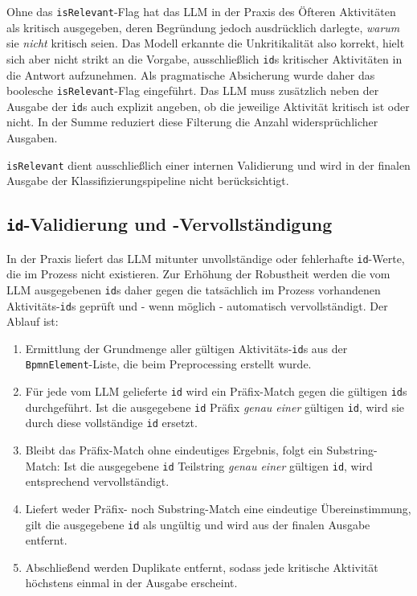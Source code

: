Ohne das \texttt{isRelevant}-Flag hat das \ac{LLM} in der Praxis des Öfteren Aktivitäten als kritisch ausgegeben, deren Begründung jedoch ausdrücklich darlegte, \emph{warum} sie \emph{nicht} kritisch seien. Das Modell erkannte die Unkritikalität also korrekt, hielt sich aber nicht strikt an die Vorgabe, ausschließlich \texttt{id}s kritischer Aktivitäten in die Antwort aufzunehmen. Als pragmatische Absicherung wurde daher das boolesche \texttt{isRelevant}-Flag eingeführt. Das \ac{LLM} muss zusätzlich neben der Ausgabe der \texttt{id}s auch explizit angeben, ob die jeweilige Aktivität kritisch ist oder nicht. In der Summe reduziert diese Filterung die Anzahl widersprüchlicher Ausgaben.

\texttt{isRelevant} dient ausschließlich einer internen Validierung und wird in der finalen Ausgabe der Klassifizierungspipeline nicht berücksichtigt.

\subsection*{\texttt{id}-Validierung und -Vervollständigung}

In der Praxis liefert das \ac{LLM} mitunter unvollständige oder fehlerhafte \texttt{id}-Werte, die im Prozess nicht existieren. Zur Erhöhung der Robustheit werden die vom \ac{LLM} ausgegebenen \texttt{id}s daher gegen die tatsächlich im Prozess vorhandenen Aktivitäts-\texttt{id}s geprüft und - wenn möglich - automatisch vervollständigt. Der Ablauf ist:

\begin{enumerate}
    \item Ermittlung der Grundmenge aller gültigen Aktivitäts-\texttt{id}s aus der \texttt{BpmnElement}-Liste, die beim Preprocessing erstellt wurde.
    \item Für jede vom \ac{LLM} gelieferte \texttt{id} wird ein Präfix-Match gegen die gültigen \texttt{id}s durchgeführt. Ist die ausgegebene \texttt{id} Präfix \emph{genau einer} gültigen \texttt{id}, wird sie durch diese vollständige \texttt{id} ersetzt.
    \item Bleibt das Präfix-Match ohne eindeutiges Ergebnis, folgt ein Substring-Match: Ist die ausgegebene \texttt{id} Teilstring \emph{genau einer} gültigen \texttt{id}, wird entsprechend vervollständigt.
    \item Liefert weder Präfix- noch Substring-Match eine eindeutige Übereinstimmung, gilt die ausgegebene \texttt{id} als ungültig und wird aus der finalen Ausgabe entfernt.
    \item Abschließend werden Duplikate entfernt, sodass jede kritische Aktivität höchstens einmal in der Ausgabe erscheint.
\end{enumerate}

